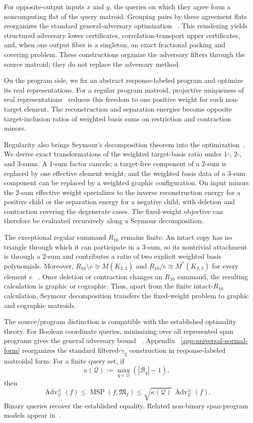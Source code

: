 \documentclass[11pt]{article}
\numberwithin{equation}{section}
\theoremstyle{remark}
\begin{document}
For opposite-output inputs $x$ and $y$, the queries on which they agree form
a noncomputing flat of the query matroid. Grouping pairs by these agreement
flats reorganizes the standard general-adversary optimization
~\cite{HoyerLeeSpalek2007,LeeMittalReichardtSpalekSzegedy2011}. This
reindexing yields structured adversary lower certificates,
correlation-transport upper certificates, and, when one output fiber is a
singleton, an exact fractional packing and covering problem. These
constructions organize the adversary filters through the source matroid; they
do not replace the adversary method.

On the program side, we fix an abstract response-labeled program and optimize
its real representations. For a regular program matroid, projective
uniqueness of real representations~\cite{BrylawskiLucas1976,Oxley2011}
reduces this freedom to one positive weight for each non-target element. The
reconstruction and separation energies become opposite target-inclusion
ratios of weighted basis sums on restriction and contraction minors.

Regularity also brings Seymour's decomposition theorem into the
optimization~\cite{Seymour1980}. We derive exact transformations of the
weighted target-basis ratio under $1$-, $2$-, and $3$-sums. A $1$-sum factor
cancels; a target-free component of a $2$-sum is replaced by one effective
element weight; and the weighted basis data of a $3$-sum component can be
replaced by a weighted graphic configuration. On input minors the $2$-sum
effective weight specializes to the inverse reconstruction energy for a
positive child or the separation energy for a negative child, with deletion
and contraction covering the degenerate cases. The fixed-weight objective
can therefore be evaluated recursively along a Seymour decomposition.

The exceptional regular summand $R_{10}$ remains finite. An intact copy has
no triangle through which it can participate in a $3$-sum, so its nontrivial
attachment is through a $2$-sum and contributes a ratio of two explicit
weighted basis polynomials. Moreover,
$R_{10}\setminus e\cong M(K_{3,3})$ and
$R_{10}/e\cong M^*(K_{3,3})$ for every element $e$
~\cite{Oxley2011}. Once deletion or contraction changes an $R_{10}$ summand,
the resulting calculation is graphic or cographic. Thus, apart from the
finite intact-$R_{10}$ calculation, Seymour decomposition transfers the
fixed-weight problem to graphic and cographic matroids.

The source/program distinction is compatible with the established optimality
theory. For Boolean coordinate queries, minimizing over all represented span
programs gives the general adversary bound
~\cite{Reichardt2009,Reichardt2014Equivalent}. Appendix
~\ref{app:universal-normal-form} reorganizes the standard
filtered-$\gamma_2$ construction in response-labeled matroidal form. For a
finite query set, if
\[
    \kappa(\mathcal Q):=
    \max_{q\in\mathcal Q}(|\mathcal B_q|-1),
\]
then
\[
    \operatorname{Adv}^{\pm}_{\mathcal Q}(f)
    \leq
    \operatorname{MSP}(f,\mathfrak M_f)
    \leq
    \sqrt{\kappa(\mathcal Q)}\,
    \operatorname{Adv}^{\pm}_{\mathcal Q}(f).
\]
Binary queries recover the established equality. Related non-binary
span-program models appear in~\cite{BeigiTaghavi2019}.
\end{document}
